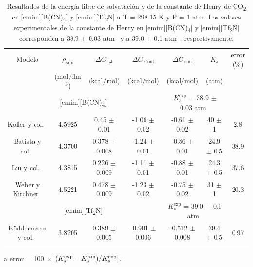 \documentclass[3p,twocolumn]{elsarticle}
\begin{document}
\begin{table}
\centering
\begin{adjustbox}{width=1\textwidth}
\begin{threeparttable}
\caption{Resultados de la energía libre de solvatación y de la constante de Henry de CO\textsubscript{2} en [emim][B(CN)\textsubscript{4}] y [emim][Tf\textsubscript{2}N] a T = 298.15 K y P = 1 atm. Los valores experimentales de la constante de Henry en [emim][B(CN)\textsubscript{4}] y [emim][Tf\textsubscript{2}N] corresponden a 38.9 $\pm$ 0.03 atm~\cite{Mahurin_2010} y a 39.0 $\pm$ 0.1 atm~\cite{Finotello_2008}, respectivamente.}
\begin{tabular}{ c c c  c  c  c  c }  
\toprule
Modelo & $\tilde{\rho}_{\text{sim}}$ & $\Delta G_{\,\text{LJ}}$  & $\Delta G_{\,\text{Coul}}$  & $\Delta G_{\,\text{sim}}$ & $K_{s}$ & error (\%)\tnote{a}\\
& (mol/dm$^{3}$) & (kcal/mol) & (kcal/mol) &  (kcal/mol) & (atm)  &  \\
			\hline
			\multicolumn{4}{c}{[emim][B(CN)\textsubscript{4}]} & \multicolumn{2}{c}{\cellcolor{gray!25}$K_{s}^{\text{exp}}$ = 38.9 $\pm$ 0.03 atm~\cite{Mahurin_2010}}\\
			\hline
Koller y col.~\cite{Koller_2012} & 4.5925 & 0.45 $\pm$ 0.01 & -1.06 $\pm$ 0.02 & -0.61 $\pm$ 0.02 & 40 $\pm$ 1 & 2.8 \\
Batista y col.~\cite{Batista_2015} & 4.3700 & 0.378 $\pm$ 0.008 & -1.24 $\pm$ 0.01  & -0.86 $\pm$ 0.01 & 24.9 $\pm$ 0.5 & 38.9 \\
Liu y col.~\cite{Liu_2014} & 4.3815 & 0.226 $\pm$ 0.009 & -1.11 $\pm$ 0.01 & -0.88 $\pm$ 0.01 & 24.3 $\pm$ 0.5 & 37.6  \\
Weber y Kirchner~\cite{Weber_2016} & 4.5221 & 0.478 $\pm$ 0.009 & -1.23 $\pm$ 0.02 & -0.75 $\pm$ 0.02 & 31 $\pm$ 1 & 20.3  \\
\hline
		\multicolumn{4}{c}{[emim][Tf\textsubscript{2}N]} & \multicolumn{2}{c}{ \cellcolor{gray!25} $K_{s}^{\text{exp}}$ = 39.0 $\pm$ 0.1 atm~\cite{Finotello_2008}}\\
		\hline
 K\"{o}ddermann y col.~\cite{K_ddermann_2007} &3.8205 & 0.389 $\pm$ 0.005 & -0.901 $\pm$ 0.006& -0.512 $\pm$ 0.008 & 39.4 $\pm$ 0.5  & 0.97  \\
 \bottomrule
\label{table:henry} 
\end{tabular}
\begin{tablenotes}
\item[a] error = 100 $\times$ $\abs{(K_s^{\text{exp}} - K_s^{\text{sim}})/K_s^{\text{exp}}}$.
\end{tablenotes}
\end{threeparttable}
\end{adjustbox}
\end{table}
\end{document}
